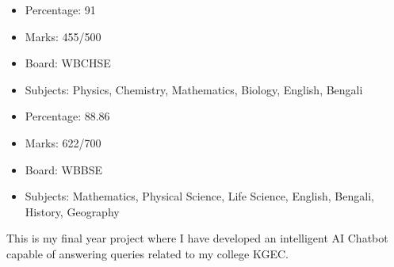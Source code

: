 \documentclass[10pt,legalpaper,ragged2e,withhyper]{altacv}
\begin{document}
\begin{paracol}{2}
    \begin{minipage}[t]{0.2\textwidth}
        \begin{itemize}
            \item Percentage: 91
            \item Marks: 455/500
        \end{itemize}
    \end{minipage}
    \begin{minipage}[t]{0.4\textwidth}
        \begin{itemize}
            \item Board: WBCHSE
            \item Subjects: Physics, Chemistry, Mathematics, Biology, English, Bengali
        \end{itemize}
    \end{minipage}

    \divider
    \begin{minipage}[t]{0.2\textwidth}
        \begin{itemize}
            \item Percentage: 88.86
            \item Marks: 622/700
        \end{itemize}
    \end{minipage}
    \begin{minipage}[t]{0.4\textwidth}
        \begin{itemize}
            \item Board: WBBSE
            \item Subjects: Mathematics, Physical Science, Life Science, English, Bengali, History, Geography
        \end{itemize}
    \end{minipage}

    This is my final year project where I have developed an intelligent AI Chatbot capable of answering queries related to my college KGEC.


\end{paracol}
\end{document}
